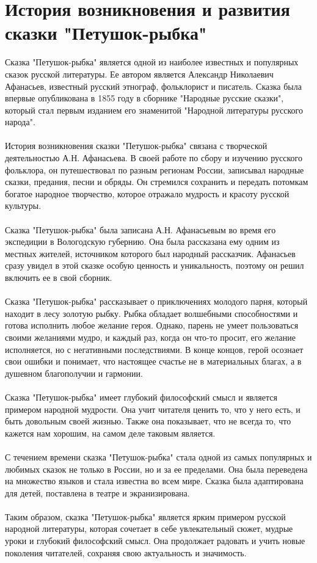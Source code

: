 \documentclass{article}
\begin{document}
\newpage
\section{История возникновения и развития сказки "{}Петушок-рыбка"{}}
Сказка "{}Петушок-рыбка"{} является одной из наиболее известных и популярных сказок русской литературы. Ее автором является Александр Николаевич Афанасьев, известный русский этнограф, фольклорист и писатель. Сказка была впервые опубликована в 1855 году в сборнике "{}Народные русские сказки"{}, который стал первым изданием его знаменитой "{}Народной литературы русского народа"{}.\\
~\\
История возникновения сказки "{}Петушок-рыбка"{} связана с творческой деятельностью А.Н. Афанасьева. В своей работе по сбору и изучению русского фольклора, он путешествовал по разным регионам России, записывал народные сказки, предания, песни и обряды. Он стремился сохранить и передать потомкам богатое народное творчество, которое отражало мудрость и красоту русской культуры.\\
~\\
Сказка "{}Петушок-рыбка"{} была записана А.Н. Афанасьевым во время его экспедиции в Вологодскую губернию. Она была рассказана ему одним из местных жителей, источником которого был народный рассказчик. Афанасьев сразу увидел в этой сказке особую ценность и уникальность, поэтому он решил включить ее в свой сборник.\\
~\\
Сказка "{}Петушок-рыбка"{} рассказывает о приключениях молодого парня, который находит в лесу золотую рыбку. Рыбка обладает волшебными способностями и готова исполнить любое желание героя. Однако, парень не умеет пользоваться своими желаниями мудро, и каждый раз, когда он что-то просит, его желание исполняется, но с негативными последствиями. В конце концов, герой осознает свои ошибки и понимает, что настоящее счастье не в материальных благах, а в душевном благополучии и гармонии.\\
~\\
Сказка "{}Петушок-рыбка"{} имеет глубокий философский смысл и является примером народной мудрости. Она учит читателя ценить то, что у него есть, и быть довольным своей жизнью. Также она показывает, что не всегда то, что кажется нам хорошим, на самом деле таковым является.\\
~\\
С течением времени сказка "{}Петушок-рыбка"{} стала одной из самых популярных и любимых сказок не только в России, но и за ее пределами. Она была переведена на множество языков и стала известна во всем мире. Сказка была адаптирована для детей, поставлена в театре и экранизирована.\\
~\\
Таким образом, сказка "{}Петушок-рыбка"{} является ярким примером русской народной литературы, которая сочетает в себе увлекательный сюжет, мудрые уроки и глубокий философский смысл. Она продолжает радовать и учить новые поколения читателей, сохраняя свою актуальность и значимость.
\end{document}
